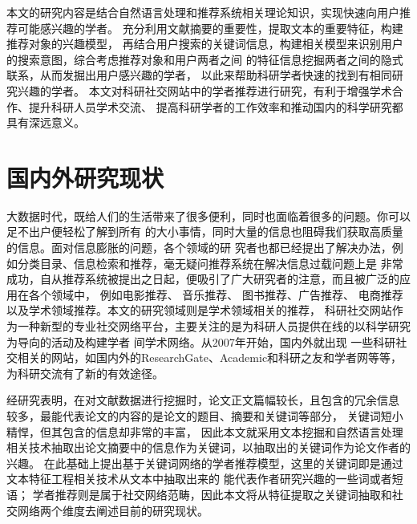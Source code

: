 本文的研究内容是结合自然语言处理和推荐系统相关理论知识，实现快速向用户推荐可能感兴趣的学者。%
充分利用文献摘要的重要性，提取文本的重要特征，构建推荐对象的兴趣模型，%
再结合用户搜索的关键词信息，构建相关模型来识别用户的搜索意图，综合考虑推荐对象和用户两者之间%
的特征信息挖掘两者之间的隐式联系，从而发掘出用户感兴趣的学者，
以此来帮助科研学者快速的找到有相同研究兴趣的学者。%
本文对科研社交网站中的学者推荐进行研究，有利于增强学术合作、提升科研人员学术交流、%
提高科研学者的工作效率和推动国内的科学研究都具有深远意义。

\section{国内外研究现状}
大数据时代，既给人们的生活带来了很多便利，同时也面临着很多的问题。你可以足不出户便轻松了解到所有%
的大小事情，同时大量的信息也阻碍我们获取高质量的信息。面对信息膨胀的问题，各个领域的研%
究者也都已经提出了解决办法，例如分类目录、信息检索和推荐，毫无疑问推荐系统在解决信息过载问题上是%
非常成功，自从推荐系统被提出之日起，便吸引了广大研究者的注意，而且被广泛的应用在各个领域中，%
例如电影推荐、%
音乐推荐、%
图书推荐、广告推荐、%
电商推荐以及学术领域推荐。本文的研究领域则是学术领域相关的推荐，%
科研社交网站作为一种新型的专业社交网络平台，主要关注的是为科研人员提供在线的以科学研究为导向的活动及构建学者%
间学术网络。从2007年开始，国内外就出现%
一些科研社交相关的网站，如国内外的ResearchGate、Academic和科研之友和学者网等等，%
为科研交流有了新的有效途径。

经研究表明，在对文献数据进行挖掘时，论文正文篇幅较长，且包含的冗余信息%
较多，最能代表论文的内容的是论文的题目、摘要和关键词等部分，%
关键词短小精悍，但其包含的信息却非常的丰富，
因此本文就采用文本挖掘和自然语言处理相关技术抽取出论文摘要中的信息作为关键词，以抽取出的关键词作为论文作者的兴趣。
在此基础上提出基于关键词网络的学者推荐模型，这里的关键词即是通过文本特征工程相关技术从文本中抽取出来的%
能代表作者研究兴趣的一些词或者短语；
学者推荐则是属于社交网络范畴，因此本文将从特征提取之关键词抽取和社交网络两个维度去阐述目前的研究现状。%

